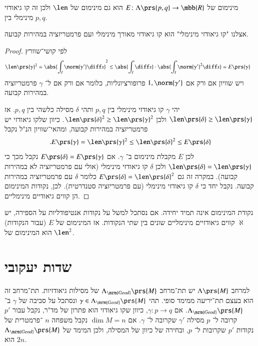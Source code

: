 \documentclass[a4paper,10pt,twoside,openany]{book}
\begin{document}
\begin{proposition}
מינימום של
$E \colon \Lambda\prs{p,q} \to \mbb{R}$
הוא גם מינימום של
$\len$
ולכן זה קו גיאודזי מינימלי בין
$p,q$.
\end{proposition}

\begin{remark}
אצלנו "קו גיאודזי מינימלי" הוא קו גיאודזי מאורך מינימלי ועם פרמטריזציה במהירות קבועה.
\end{remark}

\begin{proof}
לפי קושי־שוורץ
\begin{align*}
\len\prs{\gamma}^2 &= \abs{\int_I \norm{\gamma'} \diff s}^2 \leq \abs{\int_I \diff s} \cdot \abs{\int_I \norm{\gamma'}^2 \diff s} = E\prs{\gamma}
\end{align*}
ויש שוויון אם ורק אם
$1, \norm{\gamma'}$
פרופורציונליות, כלומר אם ורק אם ל־%
$\gamma$
פרמטריזציה במהירות קבועה.

יהי
$\gamma$
קו גיאודזי מינימלי בין
$p,q$
ותהי
$\delta$
מסילה כלשהי בין
$p,q$.
אז
$\len\prs{\delta} \geq \len\prs{\gamma}$
ולכן
$\len\prs{\delta}^2 \geq \len\prs{\gamma}^2$.
כיוון שלקו גיאודזי יש פרמטריזציה במהירות קבועה, ומהאי־שוויון הנ"ל נקבל
\[\text{.} E\prs{\gamma} = \len\prs{\gamma}^2 \leq \len\prs{\delta}^2 \leq E\prs{\delta}\]
לכן
$E$
מקבלת מינימום ב־%
$\gamma$.
אם
$E\prs{\delta} = E\prs{\gamma}$
נקבל מכך כי
$\len\prs{\delta} = \len\prs{\gamma}$
ולכן
$\delta$
קו גיאודזי מינימלי (אולי עם פרמטריזציה לא במהירות קבועה).
במקרה זה גם
$E\prs{\delta} = \len\prs{\delta}^2$
כלומר
$\delta$
עם פרמטריזציה במהירות קבועה.
נקבל יחד כי
$\delta$
קו גיאודזי מינימלי (עם פרמטריזציה סטנדרטית).
לכן, נקודות המינימום הן קווים גיאודיים מינימליים.
\end{proof}

\begin{remark}
נקודת המינימום אינה תמיד יחידה. אם נסתכל למשל על נקודות אנטיפודליות על הספירה, יש
$\aleph$
קווים גיאודזיים מינימליים שונים בין שתי הנקודות.
אז המינימום של
$E$
(עבור הנקודות) הוא המינימום של
$\len^2$.
\end{remark}

\section{שדות יעקובי}

למרחב
$\Lambda\prs{M}$
יש תת־מרחב
$\Lambda_{\mrm{Geod}}\prs{M}$
של מסילות גיאודזיות.
תת־מרחב זה הוא בעצם תת־יריעה ממימד סופי.
תהי
$\gamma \in \Lambda_{\mrm{Geod}}\prs{M}$
ונסתכל על סביבה של
$\gamma$
ב־%
$\Lambda_{\mrm{Geod}}\prs{M}$.
אם
$\gamma \colon p \to q$,
כיוון שקו גיאודזי הוא פתרון של מד"ר, נקבל עבור
$p'$
קרובה ל־%
$p$
מסילה
$\gamma'$
שקרובה ל־%
$\gamma$.
אם
$\dim M = n$
נקבל משפחה
$n$%
־פרמטרית של נקודות
$p'$
שקרובות ל־%
$p$,
ובחירה של כיוון של המסילה,
ולכן המימד של
$\Lambda_{\mrm{Geod}}\prs{M}$
הוא
$2n$.
\end{document}
